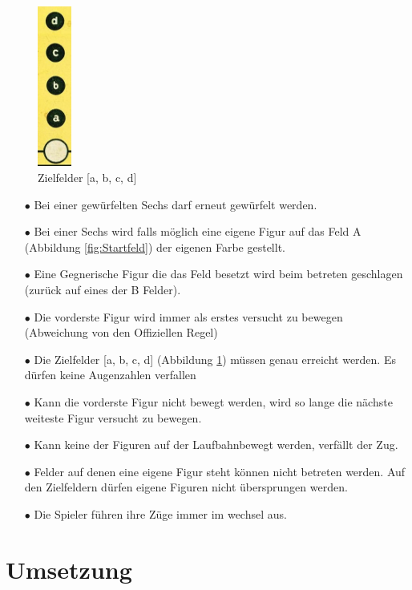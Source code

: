 \documentclass[a4paper,11pt,ngerman]{scrartcl}
\begin{document}
\begin{figure} 
	\centering
	\includegraphics[width=0.1\textwidth]{goal}		
	\caption{Zielfelder [a, b, c, d]}
	\label{fig:Zielfelder}
\end{figure}
\begin{enumerate}
	
	\item [$\bullet$] Bei einer gewürfelten Sechs darf erneut gewürfelt werden.
	\item [$\bullet$]Bei einer Sechs wird falls möglich eine eigene Figur auf das Feld A (Abbildung \ref{fig:Startfeld}) der eigenen Farbe gestellt.
	\item [$\bullet$] Eine Gegnerische Figur die das Feld besetzt wird beim betreten geschlagen (zurück auf eines der B Felder).
	\item [$\bullet$] Die vorderste Figur wird immer als erstes versucht zu bewegen (Abweichung von den Offiziellen Regel)
	\item [$\bullet$] Die Zielfelder [a, b, c, d] (Abbildung \ref{fig:Zielfelder}) müssen genau erreicht werden. Es dürfen keine \glqq Augenzahlen \grqq\space verfallen
	\item [$\bullet$] Kann die vorderste Figur nicht bewegt werden, wird so lange die nächste weiteste Figur versucht zu bewegen.
	\item [$\bullet$] Kann keine der Figuren auf der \glqq Laufbahn\grqq \space bewegt werden, verfällt der Zug.
	\item [$\bullet$] Felder auf denen eine eigene Figur steht können nicht betreten werden. Auf den Zielfeldern dürfen eigene Figuren nicht übersprungen werden.
	\item [$\bullet$] Die Spieler führen ihre Züge immer im wechsel aus.
\end{enumerate}


\section{Umsetzung}
 
\end{document}
